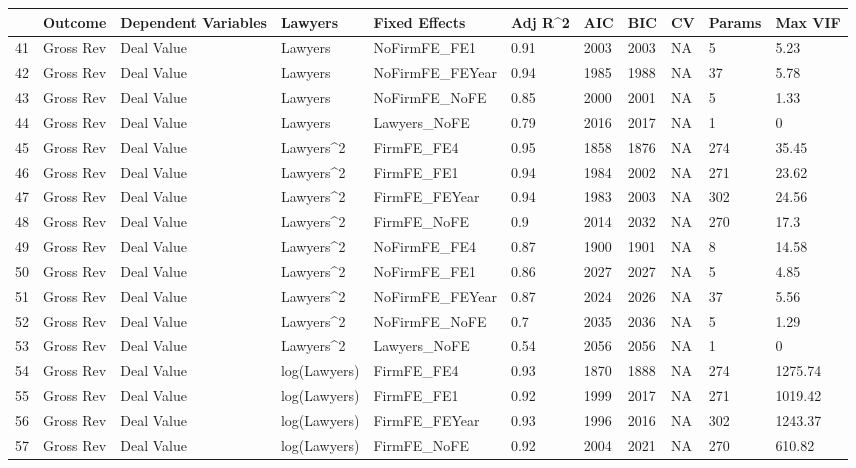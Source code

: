 \documentclass{article}
\begin{document}
\begin{table}[H]
\centering
\begin{tabular}{rllllllllll}
  \hline
 & Outcome & Dependent Variables & Lawyers & Fixed Effects & Adj R^2 & AIC & BIC & CV & Params & Max VIF \\ 
  \hline
41 & Gross Rev & Deal Value & Lawyers & NoFirmFE\_FE1 & 0.91 & 2003 & 2003 & NA & 5 & 5.23 \\ 
  42 & Gross Rev & Deal Value & Lawyers & NoFirmFE\_FEYear & 0.94 & 1985 & 1988 & NA & 37 & 5.78 \\ 
  43 & Gross Rev & Deal Value & Lawyers & NoFirmFE\_NoFE & 0.85 & 2000 & 2001 & NA & 5 & 1.33 \\ 
  44 & Gross Rev & Deal Value & Lawyers & Lawyers\_NoFE & 0.79 & 2016 & 2017 & NA & 1 & 0 \\ 
  45 & Gross Rev & Deal Value & Lawyers^2 & FirmFE\_FE4 & 0.95 & 1858 & 1876 & NA & 274 & 35.45 \\ 
  46 & Gross Rev & Deal Value & Lawyers^2 & FirmFE\_FE1 & 0.94 & 1984 & 2002 & NA & 271 & 23.62 \\ 
  47 & Gross Rev & Deal Value & Lawyers^2 & FirmFE\_FEYear & 0.94 & 1983 & 2003 & NA & 302 & 24.56 \\ 
  48 & Gross Rev & Deal Value & Lawyers^2 & FirmFE\_NoFE & 0.9 & 2014 & 2032 & NA & 270 & 17.3 \\ 
  49 & Gross Rev & Deal Value & Lawyers^2 & NoFirmFE\_FE4 & 0.87 & 1900 & 1901 & NA & 8 & 14.58 \\ 
  50 & Gross Rev & Deal Value & Lawyers^2 & NoFirmFE\_FE1 & 0.86 & 2027 & 2027 & NA & 5 & 4.85 \\ 
  51 & Gross Rev & Deal Value & Lawyers^2 & NoFirmFE\_FEYear & 0.87 & 2024 & 2026 & NA & 37 & 5.56 \\ 
  52 & Gross Rev & Deal Value & Lawyers^2 & NoFirmFE\_NoFE & 0.7 & 2035 & 2036 & NA & 5 & 1.29 \\ 
  53 & Gross Rev & Deal Value & Lawyers^2 & Lawyers\_NoFE & 0.54 & 2056 & 2056 & NA & 1 & 0 \\ 
  54 & Gross Rev & Deal Value & log(Lawyers) & FirmFE\_FE4 & 0.93 & 1870 & 1888 & NA & 274 & 1275.74 \\ 
  55 & Gross Rev & Deal Value & log(Lawyers) & FirmFE\_FE1 & 0.92 & 1999 & 2017 & NA & 271 & 1019.42 \\ 
  56 & Gross Rev & Deal Value & log(Lawyers) & FirmFE\_FEYear & 0.93 & 1996 & 2016 & NA & 302 & 1243.37 \\ 
  57 & Gross Rev & Deal Value & log(Lawyers) & FirmFE\_NoFE & 0.92 & 2004 & 2021 & NA & 270 & 610.82 \\ 

\end{tabular}
\end{table}
\end{document}
